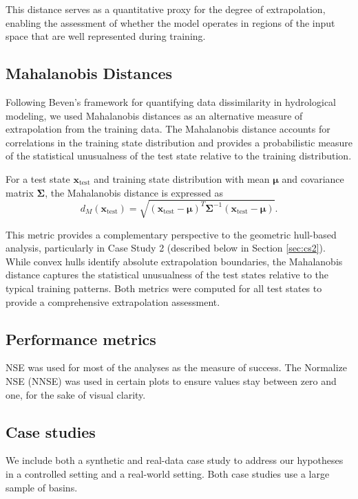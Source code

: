 \documentclass{article}
\begin{document}
This distance serves as a quantitative proxy for the degree of extrapolation, enabling the assessment of whether the model operates in regions of the input space that are well represented during training.

\subsection{Mahalanobis Distances}

Following Beven's framework for quantifying data dissimilarity in hydrological modeling, we used Mahalanobis distances as an alternative measure of extrapolation from the training data. The Mahalanobis distance accounts for correlations in the training state distribution and provides a probabilistic measure of the statistical unusualness of the test state relative to the training distribution.

For a test state $\mathbf{x}_{\text{test}}$ and training state distribution with mean $\boldsymbol{\mu}$ and covariance matrix $\boldsymbol{\Sigma}$, the Mahalanobis distance is expressed as
\[
d_M(\mathbf{x}_{\text{test}}) = \sqrt{(\mathbf{x}_{\text{test}} - \boldsymbol{\mu})^T \boldsymbol{\Sigma}^{-1} (\mathbf{x}_{\text{test}} - \boldsymbol{\mu})}.
\]

This metric provides a complementary perspective to the geometric hull-based analysis, particularly in Case Study 2 (described below in Section \ref{sec:cs2}). While convex hulls identify absolute extrapolation boundaries, the Mahalanobis distance captures the statistical unusualness of the test states relative to the typical training patterns. Both metrics were computed for all test states to provide a comprehensive extrapolation assessment.

\subsection{Performance metrics}
NSE was used for most of the analyses as the measure of success. The Normalize NSE (NNSE) was used in certain plots to ensure values stay between zero and one, for the sake of visual clarity.

\subsection{Case studies}
We include both a synthetic and real-data case study to address our hypotheses in a controlled setting and a real-world setting. Both case studies use a large sample of basins. 
\end{document}
